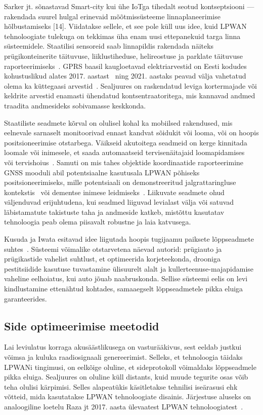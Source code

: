 \documentclass[12pt]{article}
\begin{document}
Sarker jt. sõnastavad Smart-city kui ühe IoTga tihedalt seotud kontseptsiooni — rakendada suurel hulgal erinevaid mõõtmissüsteeme linnaplaneerimise hõlbustamiseks [14].
Viidatakse sellele, et see pole küll uus idee, kuid LPWAN tehnoloogiate tulekuga on tekkimas üha enam uusi ettepanekuid targa linna süsteemidele.
Staatilisi sensoreid saab linnapildis rakendada näiteks prügikonteinerite täituvuse, liiklustiheduse, helireostuse ja parklate täituvuse raporteerimiseks~\cite{zanella}.
GPRS baasil kaugloetavad elektriarvestid on Eesti kodudes kohustuslikud alates 2017. aastast~\cite{laurit} ning 2021. aastaks peavad välja vahetatud olema ka küttegaasi arvestid~\cite{gaas}.
Sealjuures on raskendatud leviga kortermajade või keldrite arvestid enamasti ühendatud kontsentraatoritega, mis kannavad andmed traadita andmesideks sobivamasse keskkonda.

Staatiliste seadmete kõrval on olulisel kohal ka mobiilsed rakendused, mis eelnevale sarnaselt monitoorivad ennast kandvat sõidukit või looma, või on hoopis positsioneerimise otstarbega.
Väikseid akutoitega seadmeid on kerge kinnitada loomale või inimesele, et saada automaatseid tervisenäitajaid loomapidamises~\cite{germani, liliu} või tervishoius~\cite{olatinwo, petajajarvi}.
Samuti on mis tahes objektide koordinaatide raporteerimine GNSS mooduli abil potentsiaalne kasutusala LPWAN põhiseks positsioneerimiseks, mille potentsiaali on demonstreeritud jalgrattaringluse kontekstis~\cite{kimpark} või dementse inimese leidmiseks~\cite{hadwen}.
Liikuvate seadmete ohud väljenduvad erijuhtudena, kui seadmed liiguvad levialast välja või satuvad läbistamatute takistuste taha ja andmeside katkeb, mistõttu kasutatav tehnoloogia peab olema piisavalt robustne ja laia katvusega.

Kusuda ja Iwata esitavad idee liigutada hoopis tugijaamu paiksete lõppseadmete suhtes~\cite{kusuda}.
Süsteemi võimalike otstarvetena näevad autorid: prügiauto ja prügikastide vahelist suhtlust, et optimeerida korjeteekonda, drooniga pestitsiidide kasutuse tuvastamine ülisuurelt alalt ja kullerteenuse-majapidamise vaheline eelhoiatus, kui auto jõuab naabruskonda.
Sellise süsteemi eelis on levi kindlustamine ettenähtud kohtades, samaaegselt lõppseadmetele pikka eluiga garanteerides.

\subsection{Side optimeerimise meetodid}

Lai leviulatus korraga akusäästlikusega on vasturääkivus, sest eeldab justkui võimsa ja kuluka raadiosignaali genereerimist.
Selleks, et tehnoloogia täidaks LPWANi tingimusi, on eelkõige oluline, et sideprotokoll võimaldaks lõppseadmele pikka eluiga.
Sealjuures on oluline küll distants, kuid muude tegurite osas võib teha olulisi kärpimisi.
Selles alapeatükis käsitletakse tehnilisi iseärasusi ehk võtteid, mida kasutatakse LPWAN tehnoloogiate disainis.
Järjestuse aluseks on analoogiline loetelu Raza jt 2017. aasta ülevaatest LPWAN tehnoloogiatest~\cite{raza}.
\end{document}
